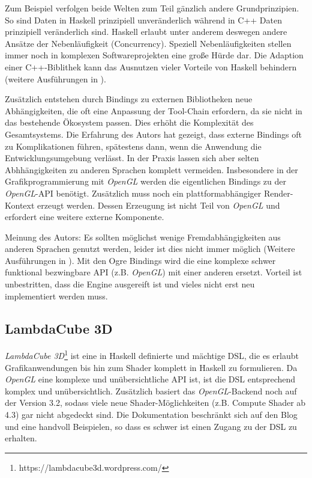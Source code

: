 Zum Beispiel verfolgen beide Welten zum Teil gänzlich andere Grundprinzipien. So sind Daten in Haskell prinzipiell unveränderlich während in C++ Daten prinzipiell veränderlich sind. Haskell erlaubt unter anderem deswegen andere Ansätze der Nebenläufigkeit (Concurrency). Speziell Nebenläufigkeiten stellen immer noch in komplexen Softwareprojekten eine große Hürde dar. Die Adaption einer C++-Biblithek kann das Ausnutzen vieler Vorteile von Haskell behindern (weitere Ausführungen in ).

Zusätzlich entstehen durch Bindings zu externen Bibliotheken neue Abhängigkeiten, die oft eine Anpassung der Tool-Chain erfordern, da sie nicht in das bestehende Ökosystem passen. Dies erhöht die Komplexität des Gesamtsystems. Die Erfahrung des Autors hat gezeigt, dass externe Bindings oft zu Komplikationen führen, spätestens dann, wenn die Anwendung die Entwicklungsumgebung verlässt. In der Praxis lassen sich aber selten Abhhängigkeiten zu anderen Sprachen komplett vermeiden. Insbesondere in der Grafikprogrammierung mit \textit{OpenGL} werden die eigentlichen Bindings zu der \textit{OpenGL}-API benötigt. Zusätzlich muss noch ein plattformabhängiger Render-Kontext erzeugt werden. Dessen Erzeugung ist nicht Teil von \textit{OpenGL} und erfordert eine weitere externe Komponente.

Meinung des Autors: Es sollten möglichst wenige Fremdabhängigkeiten aus anderen Sprachen genutzt werden, leider ist dies nicht immer möglich (Weitere Ausführungen in ). Mit den Ogre Bindings wird die eine komplexe schwer funktional bezwingbare \acs{API} (z.B. \textit{OpenGL}) mit einer anderen ersetzt. Vorteil ist unbestritten, dass die Engine ausgereift ist und vieles nicht erst neu implementiert werden muss.

\subsection{LambdaCube 3D}

\textit{LambdaCube 3D}\footnote{https://lambdacube3d.wordpress.com/} ist eine in Haskell definierte und mächtige \ac{DSL}, die es erlaubt Grafikanwendungen bis hin zum Shader komplett in Haskell zu formulieren. Da \textit{OpenGL} eine komplexe und unübersichtliche \acs{API} ist, ist die \ac{DSL} entsprechend komplex und unübersichtlich. Zusätzlich basiert das \textit{OpenGL}-Backend noch auf der Version 3.2, sodass viele neue Shader-Möglichkeiten (z.B. Compute Shader ab 4.3) gar nicht abgedeckt sind. Die Dokumentation beschränkt sich auf den Blog und eine handvoll Beispielen, so dass es schwer ist einen Zugang zu der DSL zu erhalten.


